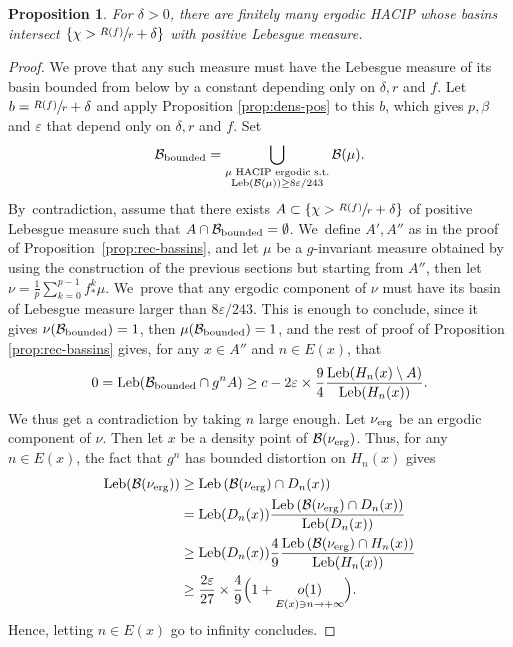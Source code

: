 \documentclass[10pt]{amsart}
\newcommand{\erg}{\textup{erg}}
\DeclareMathOperator{\Leb}{Leb}
\newtheorem{prop}[thm]{Proposition}
\theoremstyle{definition}
\begin{document}
\begin{prop}
\label{prop:fini}
For $\delta > 0$, there are finitely many ergodic HACIP whose basins intersect $\left \{ \chi > \sfrac{R(f)}{r} + \delta\right\}$ with positive Lebesgue measure.
\end{prop}

\begin{proof}
We prove that any such measure must have the Lebesgue measure of its basin bounded from below by a constant depending only on $\delta, r$ and $f$.
Let $b = \sfrac{R(f)}{r} + \delta$ and apply Proposition \ref{prop:dens-pos} to this $b$, which gives $p, \beta$ and $\varepsilon$ that depend only on $\delta, r$ and $f$. Set
\[
\mathcal{B}_{\textup{bounded}} = \bigcup_{
\substack{
\mu \text{ HACIP ergodic s.t.}\\
\Leb(\mathcal{B}(\mu)) \geq 8 \varepsilon / 243
}} \mathcal{B}(\mu).
\]
By~contradiction, assume that there exists $A \subset \left \{ \chi > \sfrac{R(f)}{r} + \delta\right\}$ of positive Lebesgue measure such that $A \cap \mathcal{B}_{\textup{bounded}} = \emptyset$. We~define $A', A''$ as in the proof of Proposition~\ref{prop:rec-bassins}, and let $\mu$ be a $g$-invariant measure obtained by using the construction of the previous sections but starting from $A''$, then let $\nu = \frac{1}{p}\sum_{k=0}^{p-1} f^k_* \mu$. We~prove that any ergodic component of $\nu$ must have its basin of Lebesgue measure larger than ${8 \varepsilon}/{243}$.
This is enough to conclude, since it gives $\nu(\mathcal{B}_{\textup{bounded}}) = 1$, then $\mu(\mathcal{B}_{\textup{bounded}}) = 1$, and the rest of proof of Proposition \ref{prop:rec-bassins} gives, for any $x \in A''$ and $n \in E(x)$, that
\[
0 = \Leb(\mathcal{B}_{\textup{bounded}} \cap g^n A) \geq c - 2 \varepsilon \times \frac{9}{4} \frac{\Leb(H_n(x) \setminus A)}{\Leb(H_n(x))}.
\]
We thus get a contradiction by taking $n$ large enough.
Let $\nu_{\erg}$ be an ergodic component of $\nu$.
Then let $x$ be a density point of $\mathcal{B}(\nu_{\erg})$.
Thus, for any $n \in E(x)$, the fact that $g^n$ has bounded distortion on $H_n(x)$ gives
\begin{align*}
\Leb(\mathcal{B}(\nu_{\erg})) &\geq \Leb\left (\mathcal{B}(\nu_{\erg}) \cap D_n(x) \right)\\
&= \Leb (D_n(x)) \frac{\Leb\left (\mathcal{B}(\nu_{\erg}) \cap D_n(x) \right)}{\Leb (D_n(x))}\\
&\geq \Leb (D_n(x)) \frac{4}{9} \frac{\Leb \left (\mathcal{B}(\nu_{\erg}) \cap H_n(x) \right)}{\Leb(H_n(x))}\\
&\geq \frac{2 \varepsilon}{27} \times \frac{4}{9} \Bigl (1 + \underset{E(x) \ni n\to +\infty}{o(1)} \Bigr).
\end{align*}
Hence, letting $n \in E(x)$ go to infinity concludes.
\end{proof}
\end{document}
